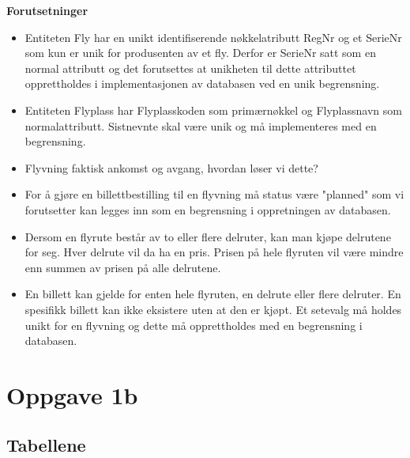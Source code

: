 \documentclass[a4paper,12pt]{article}
\begin{document}
\textbf{Forutsetninger}
\begin{itemize}
\item Entiteten Fly har en unikt identifiserende nøkkelatributt RegNr og et SerieNr som kun er unik for produsenten av et fly. Derfor er SerieNr satt som en normal attributt og det forutsettes at unikheten til dette attributtet opprettholdes i implementasjonen av databasen ved en unik begrensning.  
\item Entiteten Flyplass har Flyplasskoden som primærnøkkel og Flyplassnavn som normalattributt. Sistnevnte skal være unik og må implementeres med en begrensning.
\item Flyvning faktisk ankomst og avgang, hvordan løser vi dette?
\item For å gjøre en billettbestilling til en flyvning må status være "planned" som vi forutsetter kan legges inn som en begrensning i oppretningen av databasen. 
\item Dersom en flyrute består av to eller flere delruter, kan man kjøpe delrutene for seg. Hver delrute vil da ha en pris. Prisen på hele flyruten vil være
mindre enn summen av prisen på alle delrutene. 
\item En billett kan gjelde for enten hele flyruten, en delrute eller flere delruter. En spesifikk billett kan ikke eksistere uten at den er kjøpt. Et setevalg må holdes unikt for en flyvning og dette må opprettholdes med en begrensning i databasen.
\end{itemize}

\newpage{}

\section{Oppgave 1b}
\subsection{Tabellene}
\end{document}
